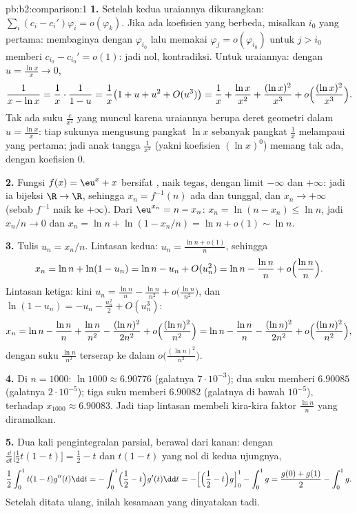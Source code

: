 \begin{solution}{pb:b2:comparison:1}
\textbf{1.} Setelah kedua uraiannya dikurangkan: $\sum_i (c_i -
c_i')\varphi_i = o(\varphi_k)$. Jika ada koefisien yang berbeda, misalkan
$i_0$ yang pertama: membaginya dengan $\varphi_{i_0}$ lalu memakai
$\varphi_j = o(\varphi_{i_0})$ untuk $j > i_0$ memberi $c_{i_0} -
c_{i_0}' = o(1)$: jadi nol, kontradiksi. Untuk uraiannya: dengan
$u = \frac{\ln x}x \to 0$,
\[
\frac{1}{x - \ln x} = \frac1x\cdot\frac{1}{1 - u}
= \frac1x\bigl(1 + u + u^2 + O(u^3)\bigr)
= \frac1x + \frac{\ln x}{x^2} + \frac{(\ln x)^2}{x^3} +
o\Bigl(\frac{(\ln x)^2}{x^3}\Bigr).
\]
Tak ada suku $\frac c{x^2}$ yang muncul karena uraiannya berupa
deret geometri dalam $u = \frac{\ln x}{x}$: tiap sukunya mengusung
pangkat $\ln x$ sebanyak pangkat $\frac1x$ melampaui yang pertama;
jadi anak tangga $\frac1{x^2}$ (yakni koefisien $(\ln x)^0$) memang
tak ada, dengan koefisien $0$.

\textbf{2.} Fungsi $f(x) = \eu^x + x$ bersifat , naik
tegas, dengan limit $-\infty$ dan $+\infty$: jadi ia bijeksi
$\R \to \R$, sehingga $x_n = f^{-1}(n)$ ada dan tunggal, dan
$x_n \to +\infty$ (sebab $f^{-1}$ naik ke $+\infty$). Dari
$\eu^{x_n} = n - x_n$: $x_n = \ln(n - x_n) \leq \ln n$, jadi
$x_n/n \to 0$ dan $x_n = \ln n + \ln(1 - x_n/n) = \ln n + o(1)
\sim \ln n$.

\textbf{3.} Tulis $u_n = x_n/n$. Lintasan kedua: $u_n = \frac{\ln n
+ o(1)}{n}$, sehingga
\[
x_n = \ln n + \ln(1 - u_n) = \ln n - u_n + O(u_n^2)
= \ln n - \frac{\ln n}{n} + o\Bigl(\frac{\ln n}n\Bigr).
\]
Lintasan ketiga: kini $u_n = \frac{\ln n}{n} - \frac{\ln n}{n^2} +
o\bigl(\frac{\ln n}{n^2}\bigr)$, dan $\ln(1 - u_n) = -u_n -
\frac{u_n^2}2 + O(u_n^3)$:
\[
x_n = \ln n - \frac{\ln n}n + \frac{\ln n}{n^2}
- \frac{(\ln n)^2}{2n^2} + o\Bigl(\frac{(\ln
n)^2}{n^2}\Bigr)
= \ln n - \frac{\ln n}{n} - \frac{(\ln n)^2}{2n^2} +
o\Bigl(\frac{(\ln n)^2}{n^2}\Bigr),
\]
dengan suku $\frac{\ln n}{n^2}$ terserap ke dalam
$o\bigl(\frac{(\ln n)^2}{n^2}\bigr)$.

\textbf{4.} Di $n = 1000$: $\ln 1000 \approx 6.90776$ (galatnya
$7\cdot10^{-3}$); dua suku memberi $6.90085$ (galatnya
$2\cdot10^{-5}$); tiga suku memberi $6.90082$ (galatnya di bawah
$10^{-5}$), terhadap $x_{1000} \approx 6.90083$. Jadi tiap lintasan
membeli kira-kira faktor $\frac{\ln n}{n}$ yang diramalkan.

\textbf{5.} Dua kali pengintegralan parsial, berawal dari kanan:
dengan $\frac{\dd}{\dd t}\bigl[\tfrac12t(1-t)\bigr] = \tfrac12 -
t$ dan $t(1-t)$ yang nol di kedua ujungnya,
\[
\frac12\int_0^1 t(1-t)g''(t)\dd t
= -\int_0^1\Bigl(\frac12 - t\Bigr)g'(t)\dd t
= -\Bigl[\Bigl(\frac12 - t\Bigr)g\Bigr]_0^1 - \int_0^1 g
= \frac{g(0) + g(1)}2 - \int_0^1 g .
\]
Setelah ditata ulang, inilah kesamaan yang dinyatakan tadi.


\end{solution}
